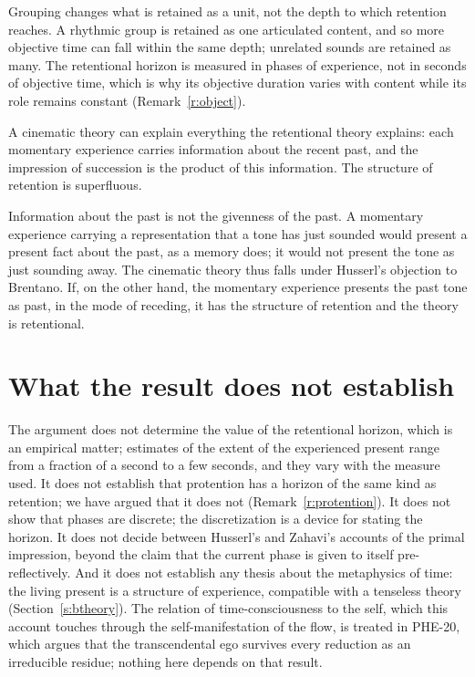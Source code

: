 \documentclass{situationist-preprint}
\begin{document}
\begin{reply}
Grouping changes what is retained as a unit, not the depth to which retention reaches. A rhythmic group is retained as one articulated content, and so more objective time can fall within the same depth; unrelated sounds are retained as many. The retentional horizon is measured in phases of experience, not in seconds of objective time, which is why its objective duration varies with content while its role remains constant (Remark~\ref{r:object}).
\end{reply}

\begin{objection}
A cinematic theory can explain everything the retentional theory explains: each momentary experience carries information about the recent past, and the impression of succession is the product of this information. The structure of retention is superfluous.
\end{objection}

\begin{reply}
Information about the past is not the givenness of the past. A momentary experience carrying a representation that a tone has just sounded would present a present fact about the past, as a memory does; it would not present the tone as just sounding away. The cinematic theory thus falls under Husserl's objection to Brentano. If, on the other hand, the momentary experience presents the past tone as past, in the mode of receding, it has the structure of retention and the theory is retentional.
\end{reply}

\section{What the result does not establish}

The argument does not determine the value of the retentional horizon, which is an empirical matter; estimates of the extent of the experienced present range from a fraction of a second to a few seconds, and they vary with the measure used. It does not establish that protention has a horizon of the same kind as retention; we have argued that it does not (Remark~\ref{r:protention}). It does not show that phases are discrete; the discretization is a device for stating the horizon. It does not decide between Husserl's and Zahavi's accounts of the primal impression, beyond the claim that the current phase is given to itself pre-reflectively. And it does not establish any thesis about the metaphysics of time: the living present is a structure of experience, compatible with a tenseless theory (Section~\ref{s:btheory}). The relation of time-consciousness to the self, which this account touches through the self-manifestation of the flow, is treated in PHE-20, which argues that the transcendental ego survives every reduction as an irreducible residue; nothing here depends on that result.
\end{document}
